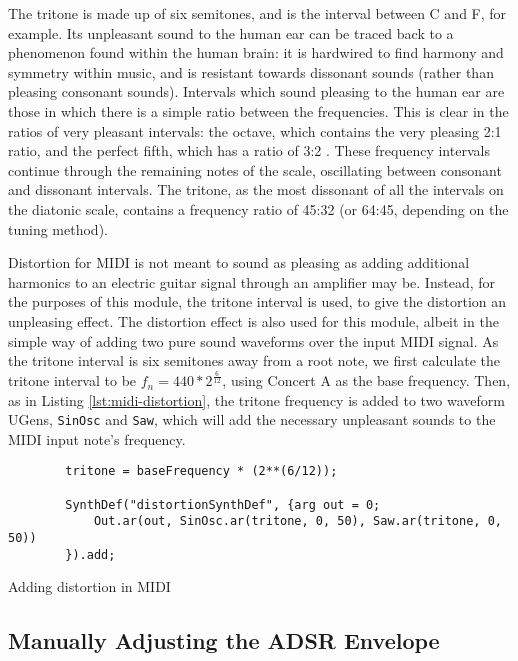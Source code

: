 The tritone is made up of six semitones, and is the interval between C and F\musSharp{}, for example. Its unpleasant sound to the human ear can be traced back to a phenomenon found within the human brain: it is hardwired to find harmony and symmetry within music, and is resistant towards dissonant sounds (rather than pleasing consonant sounds). Intervals which sound pleasing to the human ear are those in which there is a simple ratio between the frequencies. This is clear in the ratios of very pleasant intervals: the octave, which contains the very pleasing 2:1 ratio, and the perfect fifth, which has a ratio of 3:2 \cite{Gann}. These frequency intervals continue through the remaining notes of the scale, oscillating between consonant and dissonant intervals. The tritone, as the most dissonant of all the intervals on the diatonic scale, contains a frequency ratio of 45:32 (or 64:45, depending on the tuning method). 

Distortion for MIDI is not meant to sound as pleasing as adding additional harmonics to an electric guitar signal through an amplifier may be. Instead, for the purposes of this module, the tritone interval is used, to give the distortion an unpleasing effect. The distortion effect is also used for this module, albeit in the simple way of adding two pure sound waveforms over the input MIDI signal. As the tritone interval is six semitones away from a root note, we first calculate the tritone interval to be $f_n = 440 * 2^\frac{6}{12}$, using Concert A as the base frequency. Then, as in Listing \ref{lst:midi-distortion}, the tritone frequency is added to two waveform UGens, \texttt{SinOsc} and \texttt{Saw}, which will add the necessary unpleasant sounds to the MIDI input note's frequency.

\begin{listing}
	\begin{lstlisting}
		tritone = baseFrequency * (2**(6/12));
			
		SynthDef("distortionSynthDef", {arg out = 0;
			Out.ar(out, SinOsc.ar(tritone, 0, 50), Saw.ar(tritone, 0, 50))
		}).add;
	\end{lstlisting}
	\caption{Adding distortion in MIDI}
	\label{lst:midi-distortion}
\end{listing}


\subsection{Manually Adjusting the ADSR Envelope}

